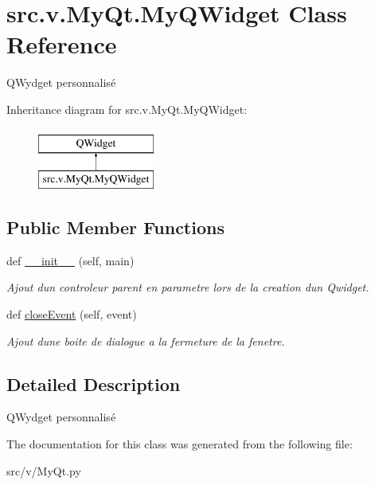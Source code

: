 \hypertarget{classsrc_1_1v_1_1_my_qt_1_1_my_q_widget}{}\section{src.\+v.\+My\+Qt.\+My\+Q\+Widget Class Reference}
\label{classsrc_1_1v_1_1_my_qt_1_1_my_q_widget}


Q\+Wydget personnalisé  


Inheritance diagram for src.\+v.\+My\+Qt.\+My\+Q\+Widget\+:\begin{figure}[H]
\begin{center}
\leavevmode
\includegraphics[height=2.000000cm]{classsrc_1_1v_1_1_my_qt_1_1_my_q_widget}
\end{center}
\end{figure}
\subsection*{Public Member Functions}
\begin{DoxyCompactItemize}
\item 
\hypertarget{classsrc_1_1v_1_1_my_qt_1_1_my_q_widget_a20be752add97969d12786aae70789164}{}def \hyperlink{classsrc_1_1v_1_1_my_qt_1_1_my_q_widget_a20be752add97969d12786aae70789164}{\+\_\+\+\_\+init\+\_\+\+\_\+} (self, main)\label{classsrc_1_1v_1_1_my_qt_1_1_my_q_widget_a20be752add97969d12786aae70789164}

\begin{DoxyCompactList}\small\item\em Ajout d\textquotesingle{}un controleur parent en parametre lors de la creation d\textquotesingle{}un Qwidget. \end{DoxyCompactList}\item 
\hypertarget{classsrc_1_1v_1_1_my_qt_1_1_my_q_widget_ad74b8a835b53df98c0304b1d9da429e5}{}def \hyperlink{classsrc_1_1v_1_1_my_qt_1_1_my_q_widget_ad74b8a835b53df98c0304b1d9da429e5}{close\+Event} (self, event)\label{classsrc_1_1v_1_1_my_qt_1_1_my_q_widget_ad74b8a835b53df98c0304b1d9da429e5}

\begin{DoxyCompactList}\small\item\em Ajout d\textquotesingle{}une boite de dialogue a la fermeture de la fenetre. \end{DoxyCompactList}\end{DoxyCompactItemize}


\subsection{Detailed Description}
Q\+Wydget personnalisé 

The documentation for this class was generated from the following file\+:\begin{DoxyCompactItemize}
\item 
src/v/My\+Qt.\+py\end{DoxyCompactItemize}
